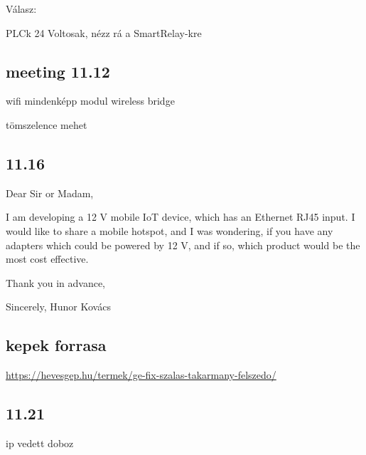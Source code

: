 \documentclass{article}
\begin{document}
	Válasz:
	
	PLCk 24 Voltosak, nézz rá a SmartRelay-kre
	
	\subsection{meeting 11.12}
	
	wifi mindenképp
	modul
	wireless bridge
		
	tömszelence mehet
	
	\subsection{11.16}
	
	Dear Sir or Madam,
	
	I am developing a 12 V mobile IoT device, which has an Ethernet RJ45 input. I would like to share a mobile hotspot, and I was wondering, if you have any adapters which could be powered by 12 V, and if so, which product would be the most cost effective.
	
	Thank you in advance,
	
	Sincerely,
	Hunor Kovács
		
	\subsection{kepek forrasa}
	\url{https://hevesgep.hu/termek/ge-fix-szalas-takarmany-felszedo/}
	
	\subsection{11.21}
	
	ip vedett doboz
	
\end{document}
